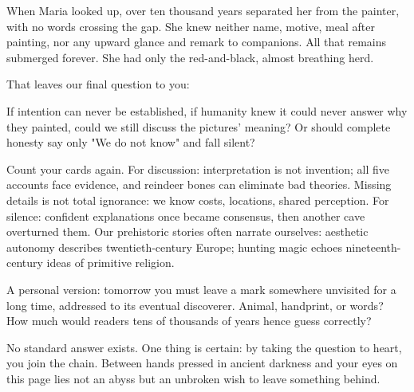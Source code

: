 When Maria looked up, over ten thousand years separated her from the painter, with no words crossing the gap. She knew neither name, motive, meal after painting, nor any upward glance and remark to companions. All that remains submerged forever. She had only the red-and-black, almost breathing herd.

That leaves our final question to you:

If intention can never be established, if humanity knew it could never answer why they painted, could we still discuss the pictures' meaning? Or should complete honesty say only "We do not know" and fall silent?

Count your cards again. For discussion: interpretation is not invention; all five accounts face evidence, and reindeer bones can eliminate bad theories. Missing details is not total ignorance: we know costs, locations, shared perception. For silence: confident explanations once became consensus, then another cave overturned them. Our prehistoric stories often narrate ourselves: aesthetic autonomy describes twentieth-century Europe; hunting magic echoes nineteenth-century ideas of primitive religion.

A personal version: tomorrow you must leave a mark somewhere unvisited for a long time, addressed to its eventual discoverer. Animal, handprint, or words? How much would readers tens of thousands of years hence guess correctly?

No standard answer exists. One thing is certain: by taking the question to heart, you join the chain. Between hands pressed in ancient darkness and your eyes on this page lies not an abyss but an unbroken wish to leave something behind.
